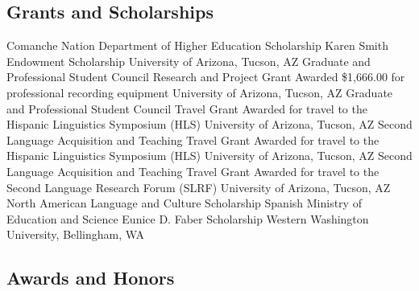 \documentclass[11pt,letterpaper]{moderncv}
\begin{document}
\vspace{-0.2in}

\subsection{Grants and Scholarships}

        {Comanche Nation Department of Higher Education Scholarship}
        {}
        {}
        {}
        {}
        {}
        {Karen Smith Endowment Scholarship}
        {}
        {}
        {}
        {University of Arizona, Tucson, AZ}
        {Graduate and Professional Student Council Research and Project Grant}
        {\newline Awarded \$1,666.00 for professional recording equipment}
        {}
        {}
        {University of Arizona, Tucson, AZ}
        {Graduate and Professional Student Council Travel Grant}
        {\newline Awarded for travel to the Hispanic Linguistics Symposium (HLS)}
        {}
        {}
        {University of Arizona, Tucson, AZ}
        {Second Language Acquisition and Teaching Travel Grant}
        {\newline Awarded for travel to the Hispanic Linguistics Symposium (HLS)}
        {}
        {}
        {University of Arizona, Tucson, AZ}
        {Second Language Acquisition and Teaching Travel Grant}
        {\newline Awarded for travel to the Second Language Research Forum (SLRF)}
        {}
        {}
        {University of Arizona, Tucson, AZ}
        {North American Language and Culture Scholarship}
        {}
        {}
        {}
        {Spanish Ministry of Education and Science}
        {Eunice D. Faber Scholarship}
        {}
        {}
        {}
        {Western Washington University, Bellingham, WA}

\subsection{Awards and Honors}
\end{document}
